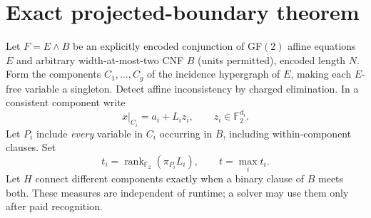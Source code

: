 \documentclass[11pt]{article}
\begin{document}
\section{Exact projected-boundary theorem}
Let $F=E\wedge B$ be an explicitly encoded conjunction of GF$(2)$
affine equations $E$ and arbitrary width-at-most-two CNF $B$
(units permitted), encoded length $N$. Form the components
$C_1,\ldots,C_g$ of the incidence hypergraph of $E$, making each
$E$-free variable a singleton. Detect affine inconsistency by
charged elimination. In a consistent component write
\[
x|_{C_i}=a_i+L_i z_i,\qquad z_i\in\mathbb F_2^{d_i}. \tag{2}
\]
Let $P_i$ include \emph{every} variable in $C_i$ occurring in $B$,
including within-component clauses. Set
\[
t_i=\operatorname{rank}_{\mathbb F_2}(\pi_{P_i}L_i),
\qquad t=\max_i t_i. \tag{3}
\]
Let $H$ connect different components exactly when a binary clause
of $B$ meets both. These measures are independent of runtime; a
solver may use them only after paid recognition.
\end{document}
